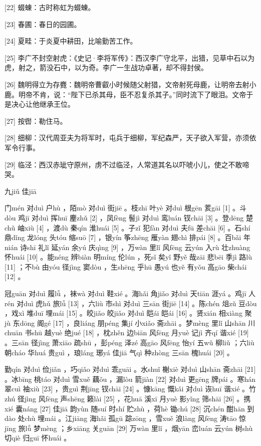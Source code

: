 \documentclass[12pt,UTF8]{ctexbook}
\begin{document}
[22] 蝃蝀：古时称虹为蝃蝀。

[23] 春圃：春日的园圃。

[24] 夏畦：于炎夏中耕田，比喻勤苦工作。

[25] 李广不封空射虎：《史记·李将军传》：西汉李广守北平，出猎，见草中石以为虎，射之，箭没石中，以为奇。李广一生战功卓著，却不得封侯。

[26] 魏明得立为存麑：魏明帝曹叡小时候随父射猎，文帝射死母鹿，让明帝去射小鹿。明帝不肯，说：“陛下已杀其母，臣不忍复杀其子。”同时流下了眼泪。文帝于是决心让他继承王位。

[27] 按辔：勒住马。

[28] 细柳：汉代周亚夫为将军时，屯兵于细柳，军纪森严，天子欲入军营，亦须依军令行事。

[29] 临泾：西汉赤玼守原州，虏不过临泾，人常道其名以吓唬小儿，使之不敢啼哭。





九jiǔ 佳jiā


门mén 对duì 户hù ，陌mò 对duì 街jiē 。枝zhī 叶yè 对duì 根gēn 荄gāi [1] 。斗dòu 鸡jī 对duì 挥huī 麈zhǔ [2] ，凤fèng 髻jì 对duì 鸾luán 钗chāi [3] 。登dēng 楚chǔ 岫xiù [4] ，渡dù 秦qín 淮huái [5] 。子zǐ 犯fàn 对duì 夫fū 差chāi [6] 。石shí 鼎dǐng 龙lóng 头tóu 缩suō [7] ，银yín 筝zhēng 雁yàn 翅chì 排pái [8] 。百bǎi 年nián 诗shī 礼lǐ 延yán 余yú 庆qìng [9] ，万wàn 里lǐ 风fēng 云yún 入rù 壮zhuàng 怀huái [10] 。能néng 辨biàn 明míng 伦lún ，死sǐ 矣yǐ 野yě 哉zāi 悲bēi 季jì 路lù [11] ；不bù 由yóu 径jìng 窦dòu ，生shēng 乎hū 愚yú 也yě 有yǒu 高gāo 柴chái [12] 。

冠guān 对duì 履lǚ ，袜wà 对duì 鞋xié 。海hǎi 角jiǎo 对duì 天tiān 涯yá 。鸡jī 人rén 对duì 虎hǔ 旅lǚ [13] ，六liù 市shì 对duì 三sān 街jiē [14] 。陈chén 俎zǔ 豆dòu ，戏xì 堆duī 埋mái [15] 。皎jiǎo 皎jiǎo 对duì 皑ái 皑ái [16] 。贤xián 相xiàng 聚jù 东dōng 阁gé [17] ，良liáng 朋péng 集jí 小xiǎo 斋zhāi 。梦mèng 里lǐ 山shān 川chuān 书shū 越yuè 绝jué [18] ，枕zhěn 边biān 风fēng 月yuè 记jì 齐qí 谐xié [19] 。三sān 径jìng 萧xiāo 疏shū ，彭péng 泽zé 高gāo 风fēng 怡yí 五wǔ 柳liǔ ；六liù 朝cháo 华huá 贵guì ，琅láng 琊yá 佳jiā 气qì 种zhòng 三sān 槐huái [20] 。

勤qín 对duì 俭jiǎn ，巧qiǎo 对duì 乖guāi 。水shuǐ 榭xiè 对duì 山shān 斋zhāi [21] 。冰bīng 桃táo 对duì 雪xuě 藕ǒu ，漏lòu 箭jiàn [22] 对duì 更gēng 牌pái 。寒hán 翠cuì 袖xiù [23] ，贵guì 荆jīng 钗chāi [24] 。慷kāng 慨kǎi 对duì 诙huī 谐xié 。竹zhú 径jìng 风fēng 声shēng 籁lài [25] ，花huā 溪xī 月yuè 影yǐng 筛shāi [26] 。携xié 囊náng [27] 佳jiā 韵yùn 随suí 时shí 贮zhù ，荷hè 锄chú [28] 沉chén 酣hān 到dào 处chù 埋mái 。江jiāng 海hǎi 孤gū 踪zōng ，雪xuě 浪làng 风fēng 涛tāo 惊jīng 旅lǚ 梦mèng ；乡xiāng 关guān [29] 万wàn 里lǐ ，烟yān 峦luán 云yún 树shù 切qiè 归guī 怀huái 。
\end{document}
